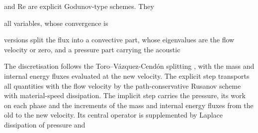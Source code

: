 
\usepackage[numbers,sort&compress]{natbib}

and Re \cite{SirianniRe2026} are explicit Godunov-type schemes. They

all variables, whose convergence is

versions split the flux into a convective part, whose eigenvalues are the flow velocity or zero, and a pressure part carrying the acoustic

The discretisation follows the Toro--V\'azquez-Cend\'on splitting \cite{ToroVazquez2012}, with the mass and internal energy
fluxes evaluated at the new velocity. The explicit step transports all quantities with the flow velocity by the
path-conservative Rusanov scheme \cite{Pares2006,Castro2006} with material-speed dissipation. The implicit step carries
the pressure, its work on each phase and the increments of the mass and internal energy fluxes from the old to the new
velocity. Its central operator is supplemented by Laplace dissipation of pressure and

